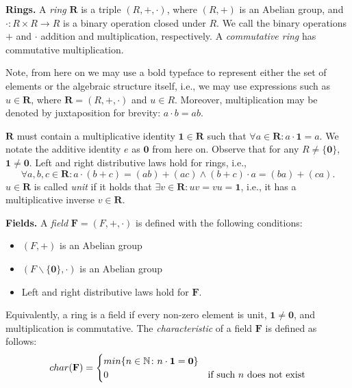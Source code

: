\textbf{Rings.} A \emph{ring} $\mathbf R$ is a triple $(R,+,\cdot)$, 
where $(R, +)$ is an Abelian group, and $\cdot \colon R \times R \to R$ 
is a binary operation closed under $R$. We call the binary operations $+$ and $\cdot$ 
addition and multiplication, respectively. A \emph{commutative ring} has commutative multiplication. 

Note, from here on we may use a bold typeface to represent either the set of elements 
or the algebraic structure itself, i.e., 
we may use expressions such as $u \in \mathbf{R}$, where $\mathbf{R} = (R,+,\cdot)$ and $u \in R$. 
Moreover, multiplication may be denoted by juxtaposition for brevity: $a\cdot b = ab$. 

$\mathbf{R}$ must contain a multiplicative identity 
$\mathbf{1} \in \mathbf{R}$ such that $\forall a \in \mathbf{R} \colon a \cdot \mathbf{1} = a$. 
We notate the additive identity $e$ 
as $\mathbf{0}$ from here on. 
Observe that for any $R \neq \{\mathbf{0}\}$, $\mathbf{1} \neq \mathbf{0}$. 
Left and right distributive laws hold for rings, i.e., 
\[
  \forall a, b, c \in \mathbf{R} \colon a \cdot (b + c) = (ab) + (ac) \land (b + c) \cdot a = (ba) + (ca).
\]
$u \in \mathbf{R}$ is called \emph{unit} if it holds 
that $\exists v \in \mathbf{R} \colon uv = vu = \mathbf{1}$, 
i.e., it has a multiplicative inverse $v \in \mathbf{R}$.

\textbf{Fields.} A \emph{field} $\mathbf{F} = (F, +, \cdot)$ is defined with the following conditions:
\begin{itemize}
  \item $(F, +)$ is an Abelian group
  \item $(F\backslash \{\mathbf{0}\}, \cdot )$ is an Abelian group
  \item Left and right distributive laws hold for $\mathbf{F}$.
\end{itemize}

Equivalently, a ring is a field if every non-zero element is unit, $\mathbf{1} \neq \mathbf{0}$, 
and multiplication is commutative. 
The \emph{characteristic} of a field $\mathbf{F}$ is defined as follows:
\begin{equation}
  char(\mathbf{F}) =
    \begin{cases}
      min\{n \in \mathbb N \colon n \cdot \mathbf{1} = \mathbf{0} \}\\
      0 & \text{if such $n$ does not exist}\\
    \end{cases}       
\end{equation}

